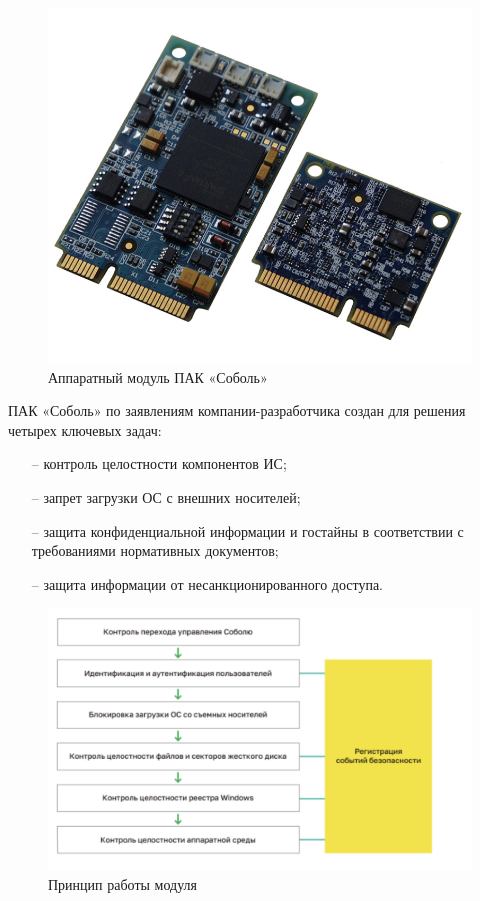  \begin{figure}[H]
  \centering
  \includegraphics[width=1\textwidth]{pict/15}
  \caption{Аппаратный модуль ПАК «Соболь»}
  \label{fig:61}
\end{figure}


ПАК «Соболь» по заявлениям компании-разработчика создан для решения четырех ключевых задач:
\begin{itemize}
  \item [--] контроль целостности компонентов ИС;
  \item [--] запрет загрузки ОС с внешних носителей;
  \item [--] защита конфиденциальной информации и гостайны в соответствии с требованиями нормативных документов;
  \item [--] защита информации от несанкционированного доступа.
\end{itemize}

\begin{figure}[H]
  \centering
  \includegraphics[width=1\textwidth]{pict/11}
  \caption{Принцип работы модуля}
  \label{fig:57}
\end{figure}


